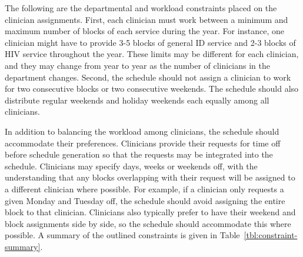 The following are the departmental and workload constraints placed on the clinician assignments. 
First, each clinician
must work between a minimum and maximum number of blocks of each service during the year.
For instance, one clinician might have to
provide 3-5 blocks of general ID service and 2-3 blocks of HIV service
throughout the year. These limits may be different for each clinician,
and they may change from year to year as
the number of clinicians in the department changes. Second, the schedule
should not assign a clinician to work for two consecutive blocks or two
consecutive weekends. The schedule should also distribute regular
weekends and holiday weekends each equally among all clinicians.

In addition to balancing the workload among clinicians, the schedule
should accommodate their preferences. Clinicians provide their requests for
time off before schedule generation so that the requests may be integrated
into the schedule. Clinicians may specify days, weeks or weekends off, with the
understanding that any blocks overlapping with their request will be assigned to
a different clinician where possible. For example, if a clinician only requests
a given Monday and Tuesday off, the schedule should avoid assigning the
entire block to that clinician. Clinicians also typically prefer to have their weekend and
block assignments side by side, so the schedule should accommodate this where possible.
A summary of the outlined constraints is given in
Table~\ref{tbl:constraint-summary}.

